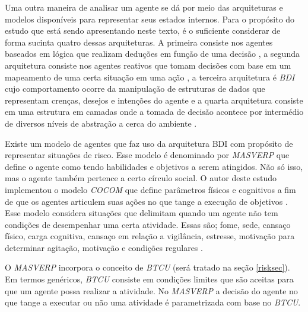 Uma outra maneira de analisar um agente se dá por meio das arquiteturas e modelos disponíveis para representar seus estados internos. Para o propósito do estudo que está sendo apresentando neste texto, é o suficiente considerar de forma sucinta quatro dessas arquiteturas. A primeira consiste nos agentes baseados em lógica que realizam deduções em função de uma decisão \cite{logicagent}, a segunda arquitetura consiste nos agentes reativos que tomam decisões com base em um mapeamento de uma certa situação em uma  ação \cite{reactiveagent}, a terceira arquitetura é \textit{BDI} cujo comportamento ocorre da manipulação de estruturas de dados que representam crenças, desejos e intenções do agente \cite{bdi} e a quarta arquitetura consiste em uma estrutura em camadas onde a tomada de decisão acontece por intermédio de diversos níveis de abstração a cerca do ambiente \cite{layeragent} \cite{whatisagent}.  

Existe um modelo de agentes que faz uso da arquitetura BDI com propósito de representar situações de risco. Esse modelo é denominado por \textit{MASVERP} que define o agente como tendo habilidades e objetivos a serem atingidos. Não só isso, mas o agente também pertence a certo círculo social. O autor deste estudo implementou o modelo \textit{COCOM} que define parâmetros físicos e cognitivos a fim de que os agentes articulem suas ações no que tange a execução de objetivos \cite{mavesp}. Esse modelo considera situações que delimitam quando um agente não tem condições de desempenhar uma certa atividade. Essas são; fome, sede, cansaço físico, carga cognitiva, cansaço em relação a vigilância, estresse, motivação para determinar agitação, motivação e condições regulares \cite{mavesp}. 

O \textit{MASVERP} incorpora o conceito de \textit{BTCU} (será tratado na seção \ref{risksec}). Em termos genéricos, \textit{BTCU} consiste em condições limites que são aceitas para que um agente possa realizar a atividade. No \textit{MASVERP} a decisão do agente no que tange a executar ou não uma atividade é parametrizada com base no \textit{BTCU}. 